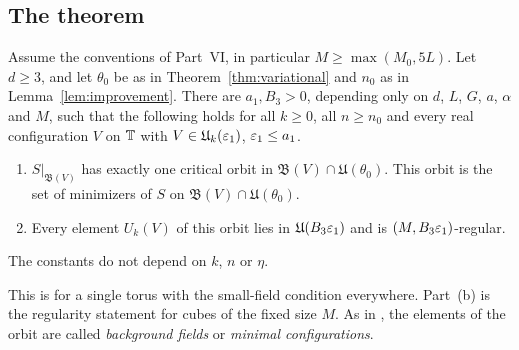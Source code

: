 \subsection{The theorem}

\begin{theorem}\label{thm:balaban}
Assume the conventions of Part~VI, in particular $M\ge\max(M_0,5L)$. Let $d\ge3$, and let $\theta_0$ be as in Theorem~\ref{thm:variational} and $n_0$ as in Lemma~\ref{lem:improvement}. There are $a_1,B_3>0$, depending only on $d$, $L$, $G$, $a$, $\alpha$ and $M$, such that the following holds for all $k\ge0$, all $n\ge n_0$ and every real configuration $V$ on $\mathbb T$ with $V\in\mathfrak U_k(\varepsilon_1)$, $\varepsilon_1\le a_1$.
\begin{enumerate}[label=(\alph*)]
\item $S|_{\mathfrak B(V)}$ has exactly one critical orbit in $\mathfrak B(V)\cap\mathfrak U(\theta_0)$. This orbit is the set of minimizers of $S$ on $\mathfrak B(V)\cap\mathfrak U(\theta_0)$.
\item Every element $U_k(V)$ of this orbit lies in $\mathfrak U(B_3\varepsilon_1)$ and is $(M,B_3\varepsilon_1)$-regular.
\end{enumerate}
The constants do not depend on $k$, $n$ or $\eta$.
\end{theorem}

This is \cite[Theorem~1]{BalVar} for a single torus with the small-field condition everywhere. Part~(b) is the regularity statement \cite[(8)--(10)]{BalVar} for cubes of the fixed size $M$. As in \cite{BalVar}, the elements of the orbit are called \emph{background fields} or \emph{minimal configurations}.

